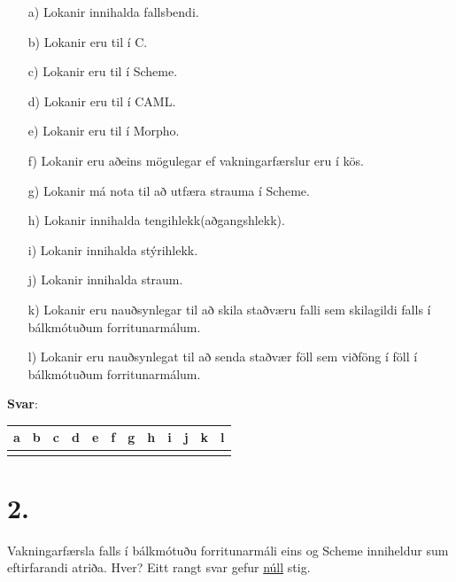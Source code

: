 \documentclass{article}
\begin{document}
\begin{itemize}
    \item[a)] Lokanir innihalda fallsbendi.
    \item[b)] Lokanir eru til í C.
    \item[c)] Lokanir eru til í Scheme.
    \item[d)] Lokanir eru til í CAML.
    \item[e)] Lokanir eru til í Morpho.
    \item[f)] Lokanir eru aðeins mögulegar ef vakningarfærslur eru í kös.
    \item[g)] Lokanir má nota til að utfæra strauma í Scheme.
    \item[h)] Lokanir innihalda tengihlekk(aðgangshlekk).
    \item[i)] Lokanir innihalda stýrihlekk.
    \item[j)] Lokanir innihalda straum.  
    \item[k)] Lokanir eru nauðsynlegar til að skila staðværu falli sem skilagildi falls í bálkmótuðum forritunarmálum.
    \item[l)] Lokanir eru nauðsynlegat til að senda staðvær föll sem viðföng í föll í bálkmótuðum forritunarmálum.        
\end{itemize}

\textbf{Svar}:

\begin{tabularx}{\textwidth}{ |X|X|X|X|X|X|X|X|X|X|X|X|}
   \hline
   \textbf{a} & \textbf{b} & \textbf{c}  & \textbf{d} & \textbf{e}  & \textbf{f}  & \textbf{g}  & \textbf{h}  & \textbf{i}  & \textbf{j}  & \textbf{k}  & \textbf{l}  \\ \hline
    & & & & & & & & & & & \\ \hline
    
\end{tabularx}


\newpage

\section{2.}

Vakningarfærsla falls í bálkmótuðu forritunarmáli eins og Scheme inniheldur sum eftirfarandi atriða.
Hver? Eitt rangt svar gefur \underline{núll} stig.
\end{document}
